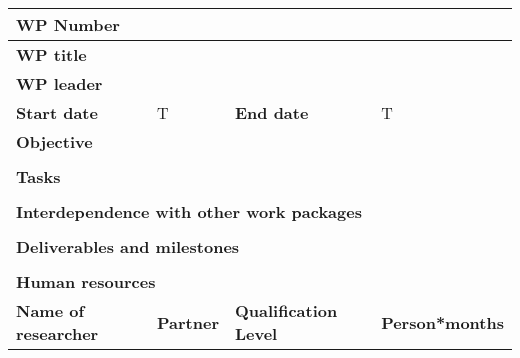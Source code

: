 \renewcommand{\arraystretch}{0.75}
\begin{center}
\begin{tabular}{|p{}|p{}|p{}|p{}|}
\hline
 \bf WP Number & \multicolumn{3}{|l|}{} \\ \hline
 \bf WP title  & \multicolumn{3}{|l|}{} \\ \hline
 \bf WP leader & \multicolumn{3}{|l|}{} \\ \hline
 \bf Start date& T     & \bf End date    & T \\ \hline
 \multicolumn{4}{|l|}{\bf Objective} \\ \hline
 \multicolumn{4}{|p{.99\textwidth}|}{
 } \\ \hline
 \multicolumn{4}{|l|}{\bf Tasks} \\ \hline
 \multicolumn{4}{|p{.99\textwidth}|}{
 } \\ \hline
 \multicolumn{4}{|l|}{\bf Interdependence with other work packages} \\ \hline
 \multicolumn{4}{|l|}{
 } \\ \hline
 \multicolumn{4}{|l|}{\bf Deliverables and milestones} \\ \hline
 \multicolumn{4}{|p{.95\textwidth}|}{
 } \\ \hline
 \multicolumn{4}{|l|}{\bf Human resources} \\ \hline
 \bf Name of researcher & \bf Partner     & \bf Qualification Level & \bf Person*months \\ \hline
\end{tabular}
\end{center}


